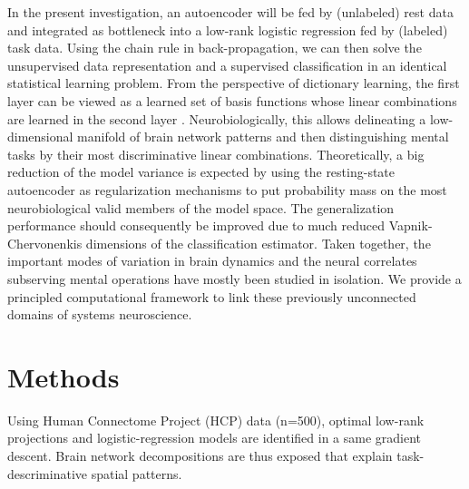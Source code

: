 \documentclass{article} %
\begin{document}
\linebreak

In the present investigation,
an autoencoder will be fed by (unlabeled) rest data and
integrated as bottleneck
into a low-rank logistic regression fed by (labeled) task data.
Using the chain rule in back-propagation, we can then
solve the unsupervised data representation and a supervised classification
in an identical statistical learning problem.
%
From the perspective of dictionary learning, the first layer can be
viewed as a learned set of basis functions
whose linear combinations are learned
in the second layer \cite{olshausen96}.
%
Neurobiologically, this allows 
delineating a low-dimensional manifold of brain network patterns and then 
distinguishing mental tasks
by their most discriminative linear combinations.
%
Theoretically, a big reduction of the model variance is expected by using the
resting-state autoencoder as regularization mechanisms
to put probability mass on the most neurobiological
valid members of the model space.
%
The generalization performance should consequently be improved due to 
much reduced Vapnik-Chervonenkis dimensions of the classification estimator.
%
Taken together,
the important modes of variation in brain dynamics and
the neural correlates subserving mental operations
have mostly been studied in isolation.
We provide a principled computational framework to link these previously
unconnected domains of systems neuroscience.


%
\section{Methods}
%
Using
Human Connectome Project (HCP) data (n=500), optimal low-rank projections and
logistic-regression models are identified in a same gradient descent. Brain
network decompositions are thus exposed that explain task-descriminative spatial
patterns.
\end{document}
